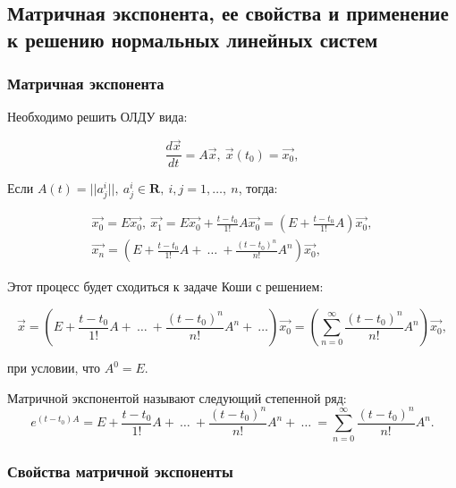\subsection{Матричная экспонента, ее свойства и применение к решению нормальных линейных систем}

\subsubsection{Матричная экспонента}
Необходимо решить ОЛДУ вида:

\begin{equation}
  	\frac{d\vec{x}}{dt} = A\vec{x},\ \vec{x}(t_0) = \vec{x_0},
  	\label{Issue5_1}
\end{equation}

Если $A(t) = ||a_j^i||,\ a_j^i \in \mathbf{R},\ i,j = 1,\dots,\ n$, тогда:

\begin{equation*}
\begin{gathered}
         \vec{x_{0}} = E\vec{x_0},\ \vec{x_1} = E\vec{x_0} + \frac{t-t_0}{1!}A\vec{x_0} = \left(E + \frac{t-t_0}{1!}A\right) \vec{x_0}, \\  
         \vec{x_n} = \left(E + \frac{t-t_0}{1!}A +\ \dots\ + \frac{(t-t_0)^n}{n!}A^n\right)\vec{x_0},	 
\end{gathered}
\end{equation*}

Этот процесс будет сходиться к задаче Коши с решением:

\begin{equation*}
   	\vec{x} = \left(E + \frac{t-t_0}{1!}A +\ \dots\ + \frac{(t-t_0)^n}{n!}A^n+\ \dots \right)\vec{x_0} = \left(\sum\limits_{n = 0}^{\infty} \frac{(t-t_0)^n}{n!}A^n\right)\vec{x_0},	 
\end{equation*}

при условии, что $A^0 = E.$

\begin{definition}
	Матричной экспонентой называют следующий степенной ряд:
	\begin{equation*}
		e^{(t-t_0)A} = E + \frac{t-t_0}{1!}A +\ \dots\ + \frac{(t-t_0)^n}{n!}A^n+\ \dots\ = \sum\limits_{n = 0}^{\infty} \frac{(t-t_0)^n}{n!}A^n.
	\end{equation*}
\end{definition}

\subsubsection{Свойства матричной экспоненты}

